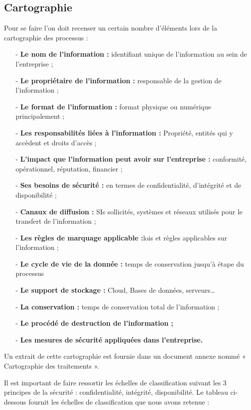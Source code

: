 \subsection{Cartographie}
Pour se faire l’on doit recenser un certain nombre d’éléments lors de la cartographie des processus :
\begin{itemize}
    \item[-] \textbf{Le nom de l’information : }identifiant unique de l’information au sein de l’entreprise ;
    \item[-] \textbf{Le propriétaire de l’information : }responsable de la gestion de l’information ;
    \item[-] \textbf{Le format de l’information : }format physique ou numérique principalement ;
    \item[-] \textbf{Les responsabilités liées à l’information : }Propriété, entités qui y accèdent et droits d’accès ;
    \item[-] \textbf{L’impact que l’information peut avoir sur l’entreprise : }conformité, opérationnel, réputation, financier ;
    \item[-] \textbf{Ses besoins de sécurité : }en termes de confidentialité, d’intégrité et de disponibilité ;
    \item[-] \textbf{Canaux de diffusion : }SIs sollicités, systèmes et réseaux utilisés pour le transfert de l’information ;
    \item[-] \textbf{Les règles de marquage applicable :}lois et règles applicables sur l’information ;
    \item[-] \textbf{Le cycle de vie de la donnée : }temps de conservation jusqu’à étape du processus
    \item[-] \textbf{Le support de stockage : }Cloud, Bases de données, serveurs…
    \item[-] \textbf{La conservation : }temps de conservation total de l’information ;
    \item[-] \textbf{Le procédé de destruction de l’information ;}
    \item[-] \textbf{Les mesures de sécurité appliquées dans l’entreprise.}
\end{itemize}
Un extrait de cette cartographie est fournie dans un document annexe nommé « Cartographie des traitements ».

Il est important de faire ressortir les échelles de classification suivant les 3 principes de la sécurité : confidentialité, intégrité, disponibilité. Le tableau ci-dessous fournit les échelles de classification que nous avons retenue :

